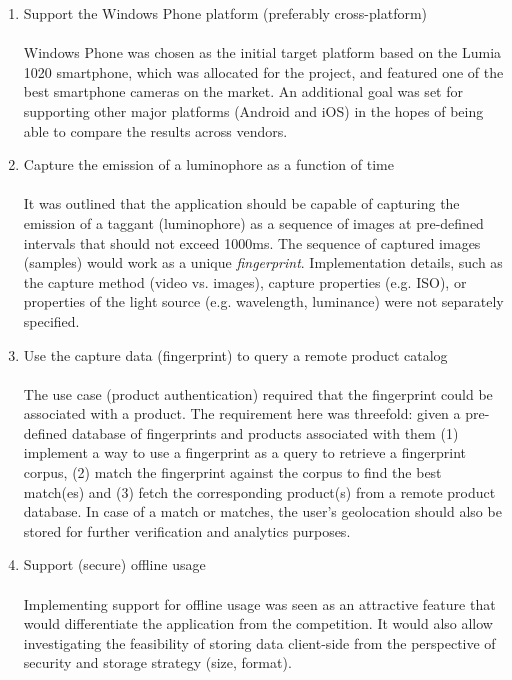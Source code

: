 \documentclass[thesis.tex]{subfiles}
\begin{document}
\begin{enumerate}[leftmargin=0.55in, label=\textbf{R\arabic*}]
	\item \label{R1} Support the Windows Phone platform (preferably cross-platform)\\ \\
	Windows Phone was chosen as the initial target platform based on the Lumia 1020 smartphone, which was allocated for the project, and featured one of the best smartphone cameras on the market. An additional goal was set for supporting other major platforms (Android and iOS) in the hopes of being able to compare the results across vendors.

    \item \label{R2} Capture the emission of a luminophore as a function of time\\ \\
    It was outlined that the application should be capable of capturing the emission of a taggant (luminophore) as a sequence of images at pre-defined intervals that should not exceed 1000ms. The sequence of captured images (samples) would work as a unique \emph{fingerprint}. Implementation details, such as the capture method (video vs. images), capture properties (e.g. ISO), or properties of the light source (e.g. wavelength, luminance) were not separately specified.

    \item \label{R3} Use the capture data (fingerprint) to query a remote product catalog\\ \\
    The use case (product authentication) required that the fingerprint could be associated with a product. The requirement here was threefold: given a pre-defined database of fingerprints and products associated with them (1) implement a way to use a fingerprint as a query to retrieve a fingerprint corpus, (2) match the fingerprint against the corpus to find the best match(es) and (3) fetch the corresponding product(s) from a remote product database. In case of a match or matches, the user's geolocation should also be stored for further verification and analytics purposes.

	\item \label{R4} Support (secure) offline usage\\ \\
	Implementing support for offline usage was seen as an attractive feature that would differentiate the application from the competition. It would also allow investigating the feasibility of storing data client-side from the perspective of security and storage strategy (size, format).
\end{enumerate}
\end{document}
